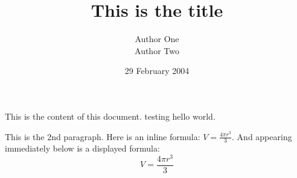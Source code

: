 \documentclass[12pt]{article}
\title{This is the title}
\author{Author One \\ Author Two}
\date{29 February 2004}
\begin{document}
\maketitle

This is the content of this document. testing hello world.

This is the 2nd paragraph.
Here is an inline formula:
$   V = \frac{4 \pi r^3}{3}  $.
And appearing immediately below
is a displayed formula:
$$  V = \frac{4 \pi r^3}{3}  $$
\end{document}

